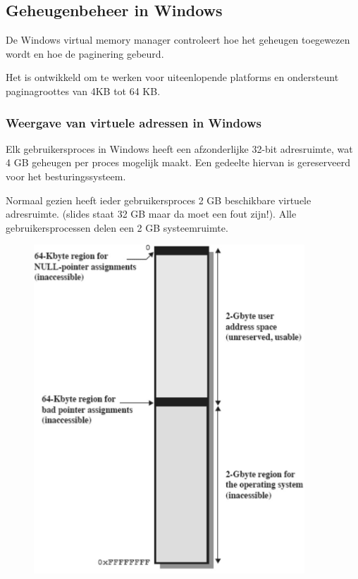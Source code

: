 \subsection{Geheugenbeheer in Windows}

De Windows virtual memory manager controleert hoe het geheugen toegewezen wordt en hoe de paginering gebeurd.

Het is ontwikkeld om te werken voor uiteenlopende platforms en ondersteunt paginagroottes van 4KB tot 64 KB.

\subsubsection{Weergave van virtuele adressen in Windows}

Elk gebruikersproces in Windows heeft een afzonderlijke 32-bit adresruimte, wat 4 GB geheugen per proces mogelijk maakt. Een gedeelte hiervan is gereserveerd voor het besturingssysteem.

Normaal gezien heeft ieder gebruikersproces 2 GB beschikbare virtuele adresruimte. (slides staat 32 GB maar da moet een fout zijn!). Alle gebruikersprocessen delen een 2 GB systeemruimte.


\begin{figure}[htp]
    \centering
            \includegraphics[width=4in]{img/weergavevirtueel}
        \caption{}
    \label{fig:}
\end{figure}


